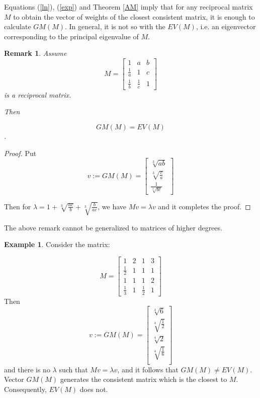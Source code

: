 \documentclass [12pt]{article}
\newtheorem{rem}{\bf Remark}
\theoremstyle{definition}
\newtheorem{ex}{\bf Example}
\begin{document}
Equations (\ref{ln}), (\ref{exp}) and Theorem \ref{AM} imply that for any reciprocal matrix $M$ to obtain the vector of weights of the closest consistent matrix, it is enough to calculate $GM(M)$.
In general, it is not so with the $EV(M)$, i.e. an eigenvector corresponding to the principal eigenvalue of $M$.

\begin{rem}
Assume
\begin{displaymath}
M = \begin{bmatrix}
1 & a & b \\ 
\frac{1}{a} & 1 & c \\ 
\frac{1}{b} & \frac{1}{c} & 1
\end{bmatrix}
\end{displaymath}
is a reciprocal matrix.
\begin{flushleft} Then \end{flushleft} $$GM(M)=EV(M)$$.
\end{rem}


\begin{proof}
Put \begin{displaymath}
v:=GM(M)= \begin{bmatrix}
\sqrt[3]{ab} \\ 
\sqrt[3]{\frac{c}{a}} \\ 
\frac{1}{\sqrt[3]{bc}}
\end{bmatrix}
\end{displaymath}

Then for $\lambda=1+\sqrt[3]{\frac{ac}{b}}+\sqrt[3]{\frac{b}{ac}}$, we have $Mv=\lambda v$ and it completes the proof.

\end{proof}

The above remark cannot be generalized to matrices of higher degrees.

\begin{ex}
Consider the matrix:

\begin{displaymath}
M = \begin{bmatrix}
1 & 2 & 1 & 3 \\ 
\frac{1}{2} & 1 & 1 & 1 \\ 
1 & 1 & 1 & 2 \\ 
\frac{1}{3} & 1 & \frac{1}{2} & 1
\end{bmatrix}
\end{displaymath}
Then
\begin{displaymath}
v:=GM(M)= \begin{bmatrix}
\sqrt[4]{6} \\ 
\sqrt[4]{\frac{1}{2}} \\ 
\sqrt[4]{2} \\ 
\sqrt[4]{\frac{1}{6}} \\ 
\end{bmatrix}
\end{displaymath}
and there is no $\lambda$ such that $Mv=\lambda v$, and it follows that $GM(M)\neq EV(M)$. Vector $GM(M)$ generates the consistent matrix which is the closest to $M$. Consequently, $EV(M)$ does not.
\end{ex}
\end{document}
